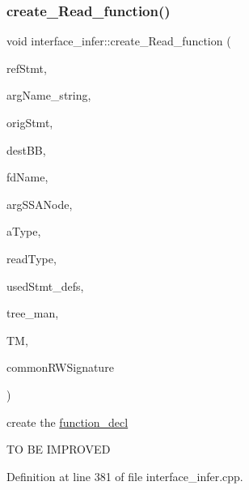 \subsubsection{\texorpdfstring{create\+\_\+\+Read\+\_\+function()}{create\_Read\_function()}}
{\footnotesize\ttfamily void interface\+\_\+infer\+::create\+\_\+\+Read\+\_\+function (\begin{DoxyParamCaption}\item[{\hyperlink{tree__node_8hpp_a6ee377554d1c4871ad66a337eaa67fd5}{tree\+\_\+node\+Ref}}]{ref\+Stmt,  }\item[{const std\+::string \&}]{arg\+Name\+\_\+string,  }\item[{\hyperlink{tree__node_8hpp_a6ee377554d1c4871ad66a337eaa67fd5}{tree\+\_\+node\+Ref}}]{orig\+Stmt,  }\item[{unsigned int}]{dest\+BB,  }\item[{const std\+::string \&}]{fd\+Name,  }\item[{\hyperlink{tree__node_8hpp_a6ee377554d1c4871ad66a337eaa67fd5}{tree\+\_\+node\+Ref}}]{arg\+S\+S\+A\+Node,  }\item[{\hyperlink{tree__node_8hpp_a6ee377554d1c4871ad66a337eaa67fd5}{tree\+\_\+node\+Ref}}]{a\+Type,  }\item[{\hyperlink{tree__node_8hpp_a6ee377554d1c4871ad66a337eaa67fd5}{tree\+\_\+node\+Ref}}]{read\+Type,  }\item[{const std\+::list$<$ \hyperlink{tree__node_8hpp_a6ee377554d1c4871ad66a337eaa67fd5}{tree\+\_\+node\+Ref} $>$ \&}]{used\+Stmt\+\_\+defs,  }\item[{const \hyperlink{tree__manipulation_8hpp_a1a9460e3a2f9fc6a96cfd2f24cc9b2a5}{tree\+\_\+manipulation\+Ref}}]{tree\+\_\+man,  }\item[{const \hyperlink{tree__manager_8hpp_a96ff150c071ce11a9a7a1e40590f205e}{tree\+\_\+manager\+Ref}}]{TM,  }\item[{bool}]{common\+R\+W\+Signature }\end{DoxyParamCaption})\hspace{0.3cm}{\ttfamily [private]}}

create the \hyperlink{structfunction__decl}{function\+\_\+decl}

TO BE I\+M\+P\+R\+O\+V\+ED 

Definition at line 381 of file interface\+\_\+infer.\+cpp.



